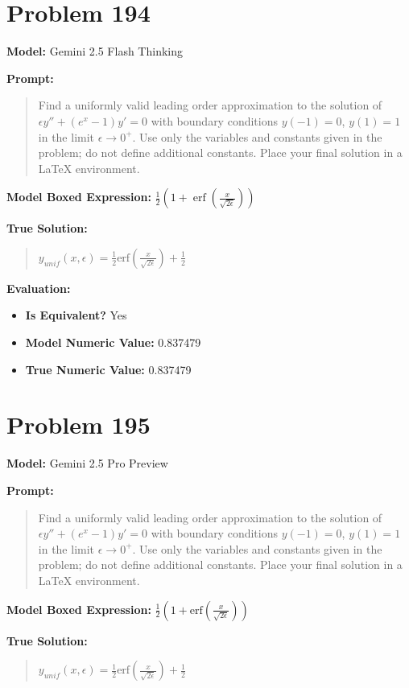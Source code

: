 \documentclass{article}
\begin{document}
{\section*{Problem 194}
\textbf{Model:} Gemini 2.5 Flash Thinking

\textbf{Prompt:}
\begin{quote}
Find a uniformly valid leading order approximation to the solution of $\epsilon y'' + (e^x - 1) y' = 0$ with boundary conditions $y(-1) = 0$, $y(1) = 1$ in the limit $\epsilon \to 0^+$. Use only the variables and constants given in the problem; do not define additional constants. Place your final solution in a $\boxed{}$ LaTeX environment.
\end{quote}
\textbf{Model Boxed Expression:} $\frac{1}{2}\left(1 + \operatorname{erf}\left(\frac{x}{\sqrt{2\epsilon}}\right)\right)$

\textbf{True Solution:}
\begin{quote}
$y_{unif}(x, \epsilon) = \frac{1}{2} \text{erf}\left(\frac{x}{\sqrt{2\epsilon}}\right) + \frac{1}{2}$
\end{quote}

\textbf{Evaluation:}
\begin{itemize}
\item \textbf{Is Equivalent?} Yes
\item \textbf{Model Numeric Value:} 0.837479
\item \textbf{True Numeric Value:} 0.837479
\end{itemize}
\vspace{1cm}
\section*{Problem 195}
\textbf{Model:} Gemini 2.5 Pro Preview

\textbf{Prompt:}
\begin{quote}
Find a uniformly valid leading order approximation to the solution of $\epsilon y'' + (e^x - 1) y' = 0$ with boundary conditions $y(-1) = 0$, $y(1) = 1$ in the limit $\epsilon \to 0^+$. Use only the variables and constants given in the problem; do not define additional constants. Place your final solution in a $\boxed{}$ LaTeX environment.
\end{quote}
\textbf{Model Boxed Expression:} $\frac{1}{2}\left(1+\text{erf}\left(\frac{x}{\sqrt{2\epsilon}}\right)\right)$

\textbf{True Solution:}
\begin{quote}
$y_{unif}(x, \epsilon) = \frac{1}{2} \text{erf}\left(\frac{x}{\sqrt{2\epsilon}}\right) + \frac{1}{2}$
\end{quote}

}
\end{document}
